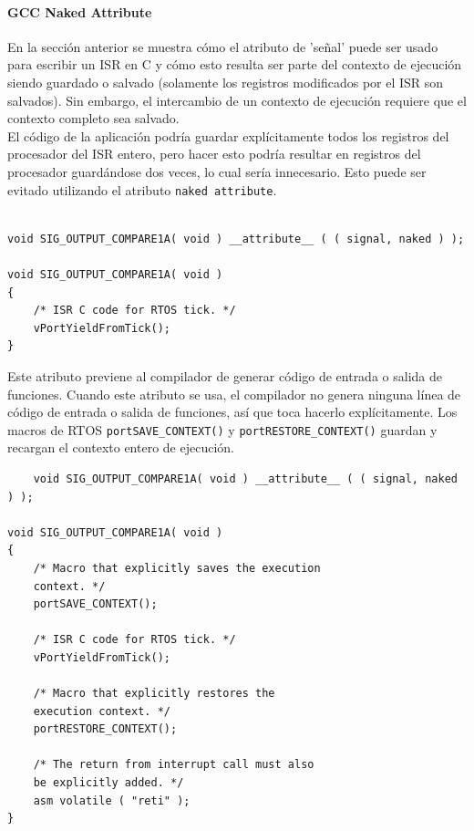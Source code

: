 \paragraph{GCC Naked Attribute}

En la sección anterior se muestra cómo el atributo de 'señal' puede ser usado para escribir un ISR en C y cómo esto resulta ser parte del contexto de ejecución siendo guardado o salvado (solamente los registros modificados por el ISR son salvados). Sin embargo, el intercambio de un contexto de ejecución requiere que el contexto completo sea salvado. \\

El código de la aplicación podría guardar explícitamente todos los registros del procesador del ISR entero, pero hacer esto podría resultar en registros del procesador guardándose dos veces, lo cual sería innecesario. Esto puede ser evitado utilizando el atributo \texttt{naked attribute}.

\begin{verbatim}
    
void SIG_OUTPUT_COMPARE1A( void ) __attribute__ ( ( signal, naked ) );

void SIG_OUTPUT_COMPARE1A( void )
{
    /* ISR C code for RTOS tick. */
    vPortYieldFromTick();
}
\end{verbatim}

Este atributo previene al compilador de generar código de entrada o salida de funciones. Cuando este atributo se usa, el compilador no genera ninguna línea de código de entrada o salida de funciones, así que toca hacerlo explícitamente. Los macros de RTOS \texttt{portSAVE\_CONTEXT()} y \texttt{portRESTORE\_CONTEXT()} guardan y recargan el contexto entero de ejecución.

\begin{verbatim}
    void SIG_OUTPUT_COMPARE1A( void ) __attribute__ ( ( signal, naked ) );

void SIG_OUTPUT_COMPARE1A( void )
{
    /* Macro that explicitly saves the execution
    context. */
    portSAVE_CONTEXT();

    /* ISR C code for RTOS tick. */
    vPortYieldFromTick();

    /* Macro that explicitly restores the
    execution context. */
    portRESTORE_CONTEXT();

    /* The return from interrupt call must also
    be explicitly added. */
    asm volatile ( "reti" );
}
\end{verbatim}


